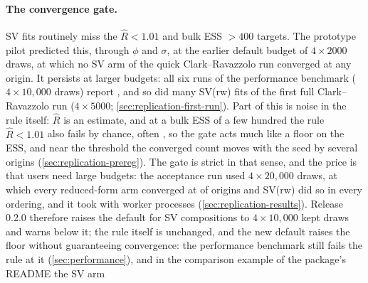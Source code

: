 \paragraph{The convergence gate.}
SV fits routinely miss the $\hat R < 1.01$ and bulk ESS $> 400$ targets. The prototype pilot
predicted this, through $\phi$ and $\sigma$, at the earlier default budget of $4 \times 2000$ draws, at
which no SV arm of the quick Clark--Ravazzolo run converged at any origin. It persists at larger
budgets: all six runs of the performance benchmark ($4 \times 10{,}000$ draws) report
, and so did many SV(rw) fits of the first full Clark--Ravazzolo run
($4 \times 5000$; \cref{sec:replication-first-run}). %
Part of this is noise in the rule itself: $\hat R$ is an estimate, and at a bulk ESS of a few
hundred the rule $\hat R < 1.01$ also fails by chance, often \citep[cf.][]{vehtari2021rank}, so
the gate acts much like a floor on the ESS, and near the threshold the converged count moves with
the seed by several origins (\cref{sec:replication-prereg}). %
The gate is strict in that sense, and the price is that users need large budgets:
the acceptance run used $4 \times 20{,}000$ draws, at which every reduced-form arm converged at
 of origins and SV(rw) did so in every ordering, and it took
 with  worker processes (\cref{sec:replication-results}). %
Release 0.2.0 therefore raises the default for SV compositions to $4 \times 10{,}000$ kept draws
and warns below it; the rule itself is unchanged, and the new default raises the floor without
guaranteeing convergence: the performance benchmark still fails the rule at it
(\cref{sec:performance}), and in the comparison example of the package's README the SV arm
